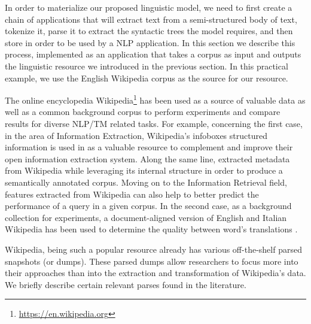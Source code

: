 In order to materialize our proposed linguistic model, we need to first create a chain of applications that will extract text from a semi-structured body of text, tokenize it, parse it to extract the syntactic trees the model requires, and then store in order to be used by a NLP application. In this section we describe this process, implemented as an application that takes a corpus as input and outputs the linguistic resource we introduced in the previous section. In this practical example, we use the English Wikipedia corpus as the source for our resource.


The online encyclopedia Wikipedia\footnote{\url{https://en.wikipedia.org}} has been used as a source of valuable data as well as a common background corpus to perform experiments and compare results for diverse NLP/TM related tasks. For example, concerning the first case, in the area of Information Extraction, Wikipedia's infoboxes structured information is used in \cite{Wu2010} as a valuable resource to complement and improve their open information extraction system. Along the same line, \cite{charton2010}  extracted metadata from Wikipedia while leveraging its internal structure in order to produce a semantically annotated corpus. Moving on to the Information Retrieval field, features extracted from Wikipedia can also help to better predict the performance of a query  \cite{katz2014} in a given  corpus.  In the second case, as a background collection for experiments, a document-aligned version of English and Italian Wikipedia has been used to determine the quality between word's translations \cite{vulic2011}.  

Wikipedia, being such a popular resource  already has various off-the-shelf parsed snapshots (or dumps). These parsed dumps allow researchers to focus more into their approaches than into the extraction and transformation of Wikipedia's data.  We briefly describe certain relevant parses found in the literature.   
%



